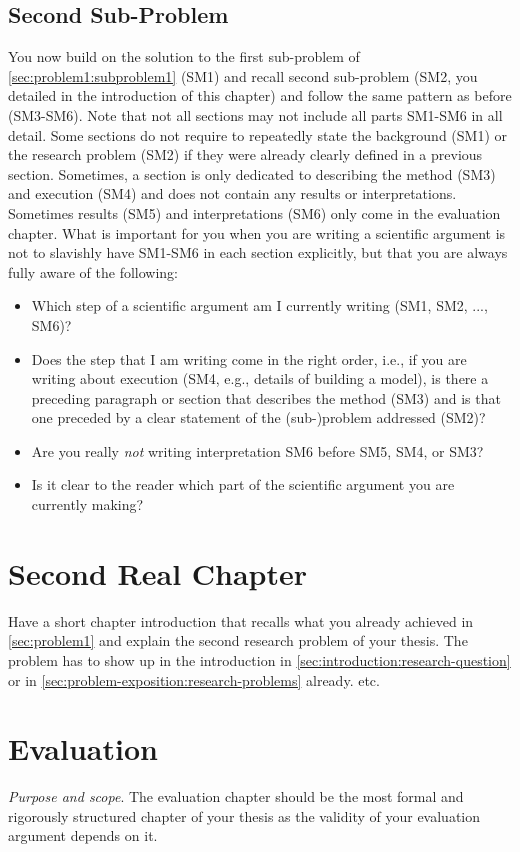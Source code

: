 \documentclass[peerreview,a4paper,english]{IEEEtran}[2015/08/26]
\begin{document}
\subsection{Second Sub-Problem}\label{sec:problem1:subproblem2}
You now build on the solution to the first sub-problem of \cref{sec:problem1:subproblem1} (SM1) and recall second sub-problem (SM2, you detailed in the introduction of this chapter) and follow the same pattern as before (SM3-SM6).
Note that not all sections may not include all parts SM1-SM6 in all detail. Some sections do not require to repeatedly state the background (SM1) or the research problem (SM2) if they were already clearly defined in a previous section. Sometimes, a section is only dedicated to describing the method (SM3) and execution (SM4) and does not contain any results or interpretations. Sometimes results (SM5) and interpretations (SM6) only come in the evaluation chapter.
What is important for you when you are writing a scientific argument is not to slavishly have SM1-SM6 in each section explicitly, but that you are always fully aware of the following:
\begin{itemize}
    \item Which step of a scientific argument am I currently writing (SM1, SM2, ..., SM6)?
    \item Does the step that I am writing come in the right order, i.e., if you are writing about execution (SM4, e.g., details of building a model), is there a preceding paragraph or section that describes the method (SM3) and is that one preceded by a clear statement of the (sub-)problem addressed (SM2)?
    \item Are you really \emph{not} writing interpretation SM6 before SM5, SM4, or SM3?
    \item Is it clear to the reader which part of the scientific argument you are currently making?
\end{itemize}
\section{Second Real Chapter}\label{sec:sub-problem2}
Have a short chapter introduction that recalls what you already achieved in \cref{sec:problem1} and explain the second research problem of your thesis. The problem has to show up in the introduction in \cref{sec:introduction:research-question} or in \cref{sec:problem-exposition:research-problems} already. etc.
\section{Evaluation}\label{sec:evaluation}
\emph{Purpose and scope}. The evaluation chapter should be the most formal and rigorously structured chapter of your thesis as the validity of your evaluation argument depends on it.
\end{document}
